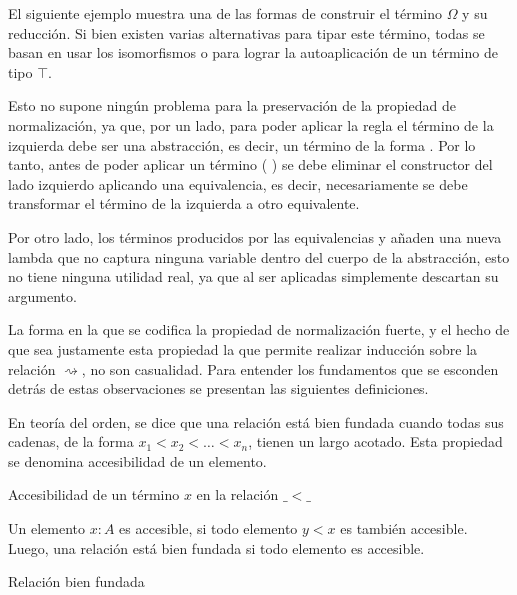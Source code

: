 \begin{example}
	El siguiente ejemplo muestra una de las formas de construir el término $\Omega$ y su reducción.
	Si bien existen varias alternativas para tipar este término, todas se basan en usar los isomorfismos  o  para lograr la autoaplicación de un término de tipo $\top$.
	
	Esto no supone ningún problema para la preservación de la propiedad de normalización, ya que, por un lado, para poder aplicar la regla  el término de la izquierda debe ser una abstracción, es decir, un término de la forma  .
	Por lo tanto, antes de poder aplicar un término (\const{[}  \const{]≡} )   se debe eliminar el constructor  del lado izquierdo aplicando una equivalencia, es decir, necesariamente se debe transformar el término de la izquierda a otro equivalente.
	
	Por otro lado, los términos producidos por las equivalencias  y  añaden una nueva lambda que no captura ninguna variable dentro del cuerpo de la abstracción, esto no tiene ninguna utilidad real, ya que al ser aplicadas simplemente descartan su argumento.
	
\end{example}

La forma en la que se codifica la propiedad de normalización fuerte, y el hecho de que sea justamente esta propiedad la que permite realizar inducción sobre la relación $\rightsquigarrow$, no son casualidad.
Para entender los fundamentos que se esconden detrás de estas observaciones se presentan las siguientes definiciones.

En teoría del orden, se dice que una relación está bien fundada cuando todas sus cadenas, de la forma $x_1 < x_2 < \dots < x_n$, tienen un largo acotado.
Esta propiedad se denomina accesibilidad de un elemento.

\begin{codigo}
	Accesibilidad de un término $x$ en la relación $\_<\_$
\end{codigo}

Un elemento $x: A$ es accesible, si todo elemento $y < x$ es también accesible.
Luego, una relación está bien fundada si todo elemento es accesible.

\begin{codigo}
	Relación bien fundada
\end{codigo}

